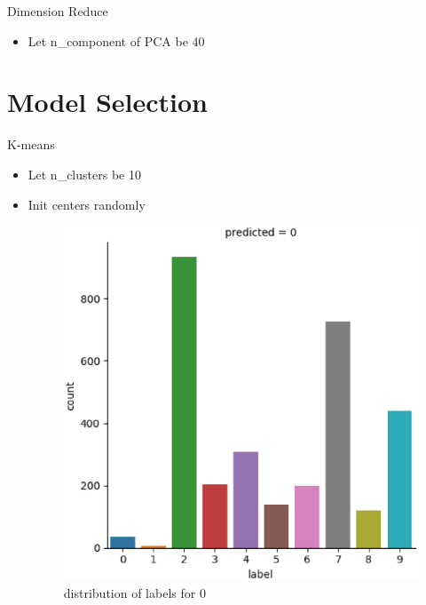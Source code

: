\documentclass[
 size=12pt,
 paper=smartboard, %
 mode=present, %
 display=slides, %
style=tuliplab,
pauseslide,
fleqn,leqno]{powerdot}
\begin{document}
\begin{slide}{Dimension Reduce}
  \begin{itemize}
    \item Let n_component of PCA be 40
  \end{itemize}
\end{slide}


\section{Model Selection}

\begin{slide}{K-means}
  \begin{itemize}
    \item Let n_clusters be 10 \pause
    \item Init centers randomly \pause
    \begin{figure}[h]
      \begin{minipage}[t]{0.4\linewidth}
        \centering
        \includegraphics[width=1.2\textwidth]{figures/label-count0.eps}
        \caption{distribution of labels for 0}
        \label{fig:label-count0}
      \end{minipage}
      \pause
      \hfill
      \begin{minipage}[t]{0.4\linewidth}
        \centering

\end{minipage}
\end{figure}
\end{itemize}
\end{slide}
\end{document}
